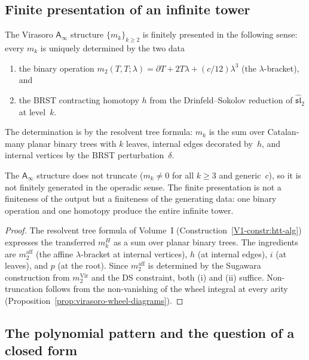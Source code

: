 \documentclass[11pt]{article}
\newcommand{\Ainf}{\mathsf{A}_{\infty}}
\begin{document}
\subsection*{Finite presentation of an infinite tower}

\begin{theorem}
\label{thm:finite-presentation-wn}
The Virasoro $\Ainf$ structure $\{m_k\}_{k \ge 2}$ is finitely
presented in the following sense: every $m_k$ is uniquely determined
by the two data
\begin{enumerate}[label=\textup{(\roman*)},nosep]
\item the binary operation $m_2(T,T;\lambda)
  = \partial T + 2T\lambda + (c/12)\lambda^3$
  \textup{(}the $\lambda$-bracket\textup{)}, and
\item the BRST contracting homotopy $h$ from the
  Drinfeld--Sokolov reduction of $\widehat{\mathfrak{sl}}_2$ at
  level~$k$.
\end{enumerate}
The determination is by the resolvent tree formula:
$m_k$ is the sum over Catalan-many planar binary trees with $k$
leaves, internal edges decorated by~$h$, and internal vertices
by the BRST perturbation~$\delta$.

The $\Ainf$ structure does not truncate ($m_k \ne 0$ for all
$k \ge 3$ and generic~$c$), so it is not finitely generated in
the operadic sense.  The finite presentation is not a finiteness
of the output but a finiteness of the generating data: one
binary operation and one homotopy produce the entire infinite tower.
\end{theorem}

\begin{proof}
The resolvent tree formula of Volume~I
(Construction~\ref*{V1-constr:htt-alg}) expresses the transferred
$m_k^H$ as a sum over planar binary trees.  The ingredients are
$m_2^{\mathrm{aff}}$ (the affine $\lambda$-bracket at internal
vertices), $h$ (at internal edges), $i$ (at leaves), and $p$
(at the root).  Since $m_2^{\mathrm{aff}}$ is determined by the
Sugawara construction from $m_2^{\mathrm{Vir}}$ and the DS
constraint, both (i) and (ii) suffice.  Non-truncation follows
from the non-vanishing of the wheel integral at every arity
(Proposition~\ref{prop:virasoro-wheel-diagrams}).
\end{proof}

\subsection*{The polynomial pattern and the question of a closed form}
\end{document}
